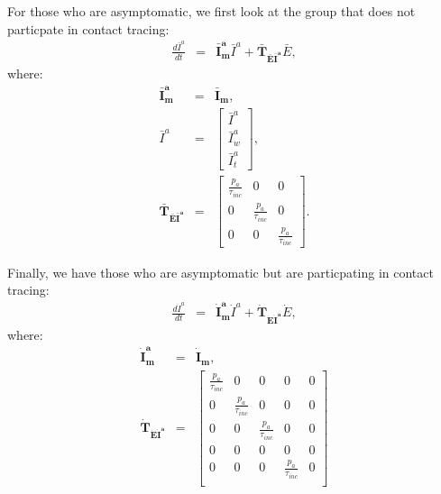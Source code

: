 \documentclass{article}
\begin{document}
For those who are asymptomatic, we first look at the group that does not particpate in contact tracing:
\begin{eqnarray}
\frac{d\bar{I}^{a}}{dt} &=& \boldsymbol{\bar{I}^{a}_{m}}  \bar{I}^{a} + \boldsymbol{\bar{T}_{\bar{E}\bar{I}^{a}}}  \bar{E}, 
\end{eqnarray}
where:
%
\begin{eqnarray}
\boldsymbol{\bar{I}^{a}_{m}} &=& \boldsymbol{\bar{I}_{m}}, \\ 
%
\bar{I}^{a} &=& 
\begin{bmatrix}
\bar{I}^{a} \\ \bar{I}^{a}_{w}\\ \bar{I}^{a}_{t}
\end{bmatrix}, \\ 
%
\boldsymbol{\bar{T}_{\bar{E}\bar{I}^{a}}} &=&
\begin{bmatrix}
\frac{p_{a}}{\tau_{inc}}  & 0                 & 0 \\ 
 0          &  \frac{p_{a}}{\tau_{inc}}  & 0 \\ 
 0          & 0                 &  \frac{p_{a}}{\tau_{inc}} 
\end{bmatrix}.
\end{eqnarray}

Finally, we have those who are asymptomatic but are particpating in contact tracing:
\begin{eqnarray}
\frac{d\dot{I}^{a}}{dt} &=& \boldsymbol{\dot{I}^{a}_{m}}  \dot{I}^{a} + \boldsymbol{\dot{T}_{\dot{E}\dot{I}^{a}}}  \dot{E}, 
\end{eqnarray}
where:
%
\begin{eqnarray}
\boldsymbol{\dot{I}^{a}_{m}} &=& \boldsymbol{\dot{I}_{m}}, \\ 
%
\boldsymbol{\dot{T}_{\dot{E}\dot{I}^{a}}} &=&
\begin{bmatrix}
\frac{p_{a}}{\tau_{inc}}  & 0                 & 0 & 0 & 0\\ 
 0          &  \frac{p_{a}}{\tau_{inc}}  & 0 & 0 & 0 \\ 
 0          & 0                 &  \frac{p_{a}}{\tau_{inc}} & 0 & 0 \\ 
0           & 0                 &  0 & 0 & 0 \\ 
0           & 0                 &  0 & \frac{p_{a}}{\tau_{inc}} & 0 \\
\end{bmatrix}
\end{eqnarray}
\end{document}
